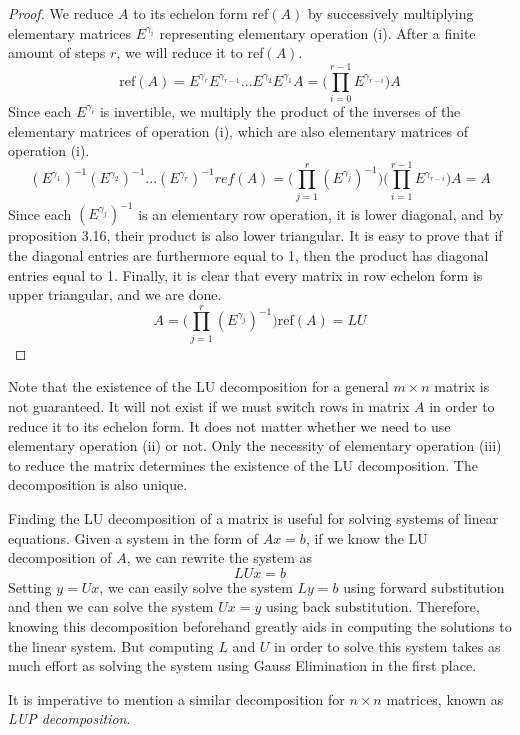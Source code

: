 \documentclass{article}
\begin{document}
    \begin{proof}
    We reduce $A$ to its echelon form ref$(A)$ by successively multiplying elementary matrices $E^{\gamma_i}$ representing elementary operation (i). After a finite amount of steps $r$, we will reduce it to ref$(A)$.
    \[ \text{ref}(A) = E^{\gamma_r} E^{\gamma_{r-1}} ... E^{\gamma_2} E^{\gamma_1} A = \bigg(\prod_{i = 0}^{r-1} E^{\gamma_{r-i}}\bigg) A\]
    Since each $E^{\gamma_i}$ is invertible, we multiply the product of the inverses of the elementary matrices of operation (i), which are also elementary matrices of operation (i). 
    \[ (E^{\gamma_1})^{-1} (E^{\gamma_2})^{-1} ... (E^{\gamma_r})^{-1} ref(A) = \bigg( \prod_{j = 1}^r (E^{\gamma_j})^{-1} \bigg) \bigg( \prod_{i=1}^{r-1} E^{\gamma_{r-i}} \bigg) A = A \]
    Since each $(E^{\gamma_j})^{-1}$ is an elementary row operation, it is lower diagonal, and by proposition 3.16, their product is also lower triangular. It is easy to prove that if the diagonal entries are furthermore equal to 1, then the product has diagonal entries equal to 1. Finally, it is clear that every matrix in row echelon form is upper triangular, and we are done. 
    \[ A = \bigg( \prod_{j = 1}^r (E^{\gamma_j})^{-1} \bigg) \text{ref}(A) = L U\]
    \end{proof}

    Note that the existence of the LU decomposition for a general $m \times n$ matrix is not guaranteed. It will not exist if we must switch rows in matrix $A$ in order to reduce it to its echelon form. It does not matter whether we need to use elementary operation (ii) or not. Only the necessity of elementary operation (iii) to reduce the matrix determines the existence of the LU decomposition. The decomposition is also unique. 

    Finding the LU decomposition of a matrix is useful for solving systems of linear equations. Given a system in the form of $A x = b$, if we know the LU decomposition of $A$, we can rewrite the system as 
    \[ L U x = b\]
    Setting $y = U x$, we can easily solve the system $L y = b$ using forward substitution and then we can solve the system $U x = y$ using back substitution. Therefore, knowing this decomposition beforehand greatly aids in computing the solutions to the linear system. But computing $L$ and $U$ in order to solve this system takes as much effort as solving the system using Gauss Elimination in the first place. 

    It is imperative to mention a similar decomposition for $n \times n$ matrices, known as \textit{LUP decomposition}. 
\end{document}
